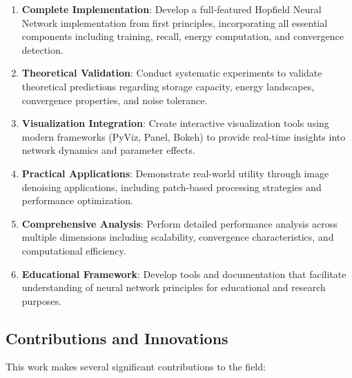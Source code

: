 \documentclass[11pt,a4paper]{article}
\begin{document}
\begin{enumerate}
    \item \textbf{Complete Implementation}: Develop a full-featured Hopfield Neural Network implementation from first principles, incorporating all essential components including training, recall, energy computation, and convergence detection.
    
    \item \textbf{Theoretical Validation}: Conduct systematic experiments to validate theoretical predictions regarding storage capacity, energy landscapes, convergence properties, and noise tolerance.
    
    \item \textbf{Visualization Integration}: Create interactive visualization tools using modern frameworks (PyViz, Panel, Bokeh) to provide real-time insights into network dynamics and parameter effects.
    
    \item \textbf{Practical Applications}: Demonstrate real-world utility through image denoising applications, including patch-based processing strategies and performance optimization.
    
    \item \textbf{Comprehensive Analysis}: Perform detailed performance analysis across multiple dimensions including scalability, convergence characteristics, and computational efficiency.
    
    \item \textbf{Educational Framework}: Develop tools and documentation that facilitate understanding of neural network principles for educational and research purposes.
\end{enumerate}

\subsection{Contributions and Innovations}

This work makes several significant contributions to the field:
\end{document}
